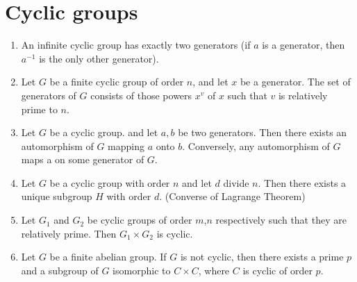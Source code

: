 \documentclass[main.tex]{subfiles}
\begin{document}
\section{Cyclic groups}

\begin{theorem}
\label{general} 	
	\begin{enumerate}
	\item An infinite cyclic group has exactly two generators (if $a$ is a generator, then $a^{-1}$ is the only other generator).
	\item Let $G$ be a finite cyclic group of order $n$, and let $x$ be a generator. The set of generators of $G$ consists of those powers $x^v$ of $x$ such that $v$ is relatively prime to $n$.
	\item Let $G$ be a cyclic group. and let $a,b$ be two generators. Then there exists an automorphism of $G$ mapping $a$ onto $b$. Conversely, any automorphism of $G$ maps a on some generator of $G$.
	\item Let $G$ be a cyclic group with order $n$ and let $d$ divide $n$. Then there exists a unique subgroup $H$ with order $d$. (Converse of Lagrange Theorem)
	\item Let $G_1$ and $G_2$ be cyclic groups of order $m$,$n$ respectively such that they are relatively prime. Then $G_1 \times G_2$ is cyclic. 
	\item Let $G$ be a finite abelian group. If $G$ is not cyclic, then there exists a prime $p$ and a subgroup of $G$ isomorphic to $C \times C$, where $C$ is cyclic of order $p$.
	\end{enumerate}

\end{theorem}
\end{document}
